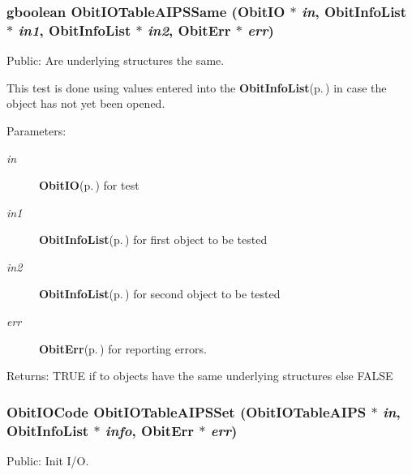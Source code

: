 \subsubsection{\setlength{\rightskip}{0pt plus 5cm}gboolean Obit\-IOTable\-AIPSSame ({\bf Obit\-IO} $\ast$ {\em in}, {\bf Obit\-Info\-List} $\ast$ {\em in1}, {\bf Obit\-Info\-List} $\ast$ {\em in2}, {\bf Obit\-Err} $\ast$ {\em err})}\label{ObitIOTableAIPS_8c_a11}


Public: Are underlying structures the same. 

This test is done using values entered into the {\bf Obit\-Info\-List}{\rm (p.\,\pageref{structObitInfoList})} in case the object has not yet been opened. \begin{Desc}
\item[Parameters:]
\begin{description}
\item[{\em in}]{\bf Obit\-IO}{\rm (p.\,\pageref{structObitIO})} for test \item[{\em in1}]{\bf Obit\-Info\-List}{\rm (p.\,\pageref{structObitInfoList})} for first object to be tested \item[{\em in2}]{\bf Obit\-Info\-List}{\rm (p.\,\pageref{structObitInfoList})} for second object to be tested \item[{\em err}]{\bf Obit\-Err}{\rm (p.\,\pageref{structObitErr})} for reporting errors. \end{description}
\end{Desc}
\begin{Desc}
\item[Returns:]TRUE if to objects have the same underlying structures else FALSE \end{Desc}
\subsubsection{\setlength{\rightskip}{0pt plus 5cm}Obit\-IOCode Obit\-IOTable\-AIPSSet ({\bf Obit\-IOTable\-AIPS} $\ast$ {\em in}, {\bf Obit\-Info\-List} $\ast$ {\em info}, {\bf Obit\-Err} $\ast$ {\em err})}\label{ObitIOTableAIPS_8c_a16}


Public: Init I/O. 

